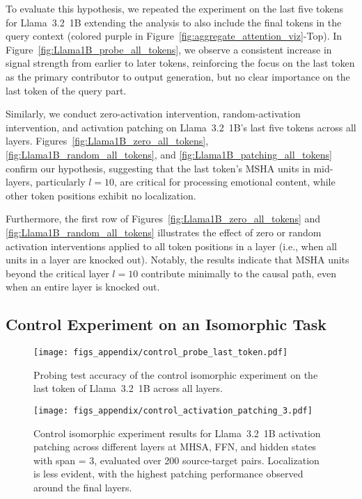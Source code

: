 To evaluate this hypothesis, we repeated the experiment on the last five tokens for Llama~3.2~1B extending the analysis to also include the final tokens in the query context (colored purple in Figure~\ref{fig:aggregate_attention_viz}-Top). In Figure~\ref{fig:Llama1B_probe_all_tokens}, we observe a consistent increase in signal strength from earlier to later tokens, reinforcing the focus on the last token as the primary contributor to output generation, but no clear importance on the last token of the query part. 

Similarly, we conduct zero-activation intervention, random-activation intervention, and activation patching on Llama~3.2~1B’s last five tokens across all layers. Figures~\ref{fig:Llama1B_zero_all_tokens}, \ref{fig:Llama1B_random_all_tokens}, and \ref{fig:Llama1B_patching_all_tokens} confirm our hypothesis, suggesting that the last token's MSHA units in mid-layers, particularly \({l = 10}\), are critical for processing emotional content, while other token positions exhibit no localization.

Furthermore, the first row of Figures~\ref{fig:Llama1B_zero_all_tokens} and \ref{fig:Llama1B_random_all_tokens} illustrates the effect of zero or random activation interventions applied to all token positions in a layer (i.e., when all units in a layer are knocked out). Notably, the results indicate that MSHA units beyond the critical layer \({l = 10}\) contribute minimally to the causal path, even when an entire layer is knocked out.

\subsection{Control Experiment on an Isomorphic Task} \label{app:control}

\begin{figure}[bht]
    \centering
    \texttt{[image: figs\_appendix/control\_probe\_last\_token.pdf]}
  \caption{Probing test accuracy of the control isomorphic experiment on the last token of Llama~3.2~1B across all layers.}
  \label{fig:Llama1B_control_probe}
\end{figure} 

\begin{figure*}[t!]
    \centering
    \texttt{[image: figs\_appendix/control\_activation\_patching\_3.pdf]}
    \caption{Control isomorphic experiment results for Llama~3.2~1B activation patching across different layers at MHSA, FFN, and hidden states with span = 3, evaluated over 200 source-target pairs. Localization is less evident, with the highest patching performance observed around the final layers.} 
    \label{fig:Llama1B_control_patching}
\end{figure*}



